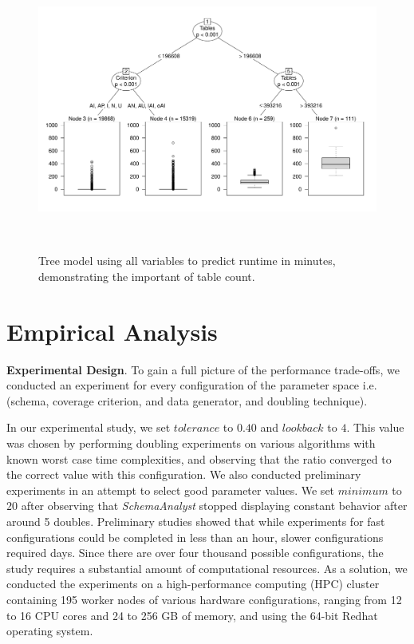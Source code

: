 

\begin{figure}[t]
\centering
  \centering
  \includegraphics[width=1.025\linewidth]{diagrams/AllTree.pdf}
  \vspace*{-.25in}

  \caption{Tree model using all variables to predict runtime in minutes, demonstrating the important of table count.
  \vspace{-.30in}}~\label{fig:atree}

\end{figure}

\section{Empirical Analysis}

\textbf{Experimental Design}. To gain a full picture of the performance trade-offs, we conducted an experiment for every configuration
of the parameter space i.e. (schema, coverage criterion, and data generator, and doubling technique). 

In our experimental study, we set $\mathit{tolerance}$ to $0.40$ and $\mathit{lookback}$ to $4$. This value was chosen
by performing doubling experiments on various algorithms with known worst case time complexities, and observing that the
ratio converged to the correct value with this configuration.  We also conducted preliminary experiments in an attempt
to select good parameter values. We set $\mathit{minimum}$ to $20$ after observing that \textit{SchemaAnalyst} stopped
displaying constant behavior after around 5 doubles.  Preliminary studies showed that while experiments for fast
configurations could be completed in less than an hour, slower configurations required days.  Since there are over four
thousand possible configurations, the study requires a substantial amount of computational resources.  As a solution, we
conducted the experiments on a high-performance computing (HPC) cluster containing 195 worker nodes of various hardware
configurations, ranging from 12 to 16 CPU cores and 24 to 256 GB of memory, and using the 64-bit Redhat operating
system.
